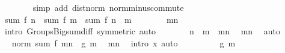\begin{isabellebody}
\ \ \ \ \ \ \isamarkupfalse%
\ {\isacharparenleft}{\kern0pt}simp\ add{\isacharcolon}{\kern0pt}\ dist{\isacharunderscore}{\kern0pt}norm\ norm{\isacharunderscore}{\kern0pt}minus{\isacharunderscore}{\kern0pt}commute{\isacharparenright}{\kern0pt}\isanewline
\ \ \ \ \isamarkupfalse%
\ \isamarkupfalse%
\ {\isachardoublequoteopen}sum\ f\ {\isacharbraceleft}{\kern0pt}{\isachardot}{\kern0pt}{\isachardot}{\kern0pt}n{\isacharbraceright}{\kern0pt}\ {\isacharminus}{\kern0pt}\ sum\ f\ {\isacharbraceleft}{\kern0pt}{\isachardot}{\kern0pt}{\isachardot}{\kern0pt}m{\isacharbraceright}{\kern0pt}\ {\isacharequal}{\kern0pt}\ sum\ f\ {\isacharparenleft}{\kern0pt}{\isacharbraceleft}{\kern0pt}{\isachardot}{\kern0pt}{\isachardot}{\kern0pt}n{\isacharbraceright}{\kern0pt}\ {\isacharminus}{\kern0pt}\ {\isacharbraceleft}{\kern0pt}{\isachardot}{\kern0pt}{\isachardot}{\kern0pt}m{\isacharbraceright}{\kern0pt}{\isacharparenright}{\kern0pt}{\isachardoublequoteclose}\isanewline
\ \ \ \ \ \ \isamarkupfalse%
\ mn\ \isamarkupfalse%
\ {\isacharparenleft}{\kern0pt}intro\ Groups{\isacharunderscore}{\kern0pt}Big{\isachardot}{\kern0pt}sum{\isacharunderscore}{\kern0pt}diff\ {\isacharbrackleft}{\kern0pt}symmetric{\isacharbrackright}{\kern0pt}{\isacharparenright}{\kern0pt}\ auto\isanewline
\ \ \ \ \isamarkupfalse%
\ \isamarkupfalse%
\ {\isachardoublequoteopen}{\isacharbraceleft}{\kern0pt}{\isachardot}{\kern0pt}{\isachardot}{\kern0pt}n{\isacharbraceright}{\kern0pt}\ {\isacharminus}{\kern0pt}\ {\isacharbraceleft}{\kern0pt}{\isachardot}{\kern0pt}{\isachardot}{\kern0pt}m{\isacharbraceright}{\kern0pt}\ {\isacharequal}{\kern0pt}\ {\isacharbraceleft}{\kern0pt}m{\isacharless}{\kern0pt}{\isachardot}{\kern0pt}{\isachardot}{\kern0pt}n{\isacharbraceright}{\kern0pt}{\isachardoublequoteclose}\ \isamarkupfalse%
\ mn\ \isamarkupfalse%
\ auto\isanewline
\ \ \ \ \isamarkupfalse%
\ \isamarkupfalse%
\ {\isachardoublequoteopen}norm\ {\isacharparenleft}{\kern0pt}sum\ f\ {\isacharbraceleft}{\kern0pt}m{\isacharless}{\kern0pt}{\isachardot}{\kern0pt}{\isachardot}{\kern0pt}n{\isacharbraceright}{\kern0pt}{\isacharparenright}{\kern0pt}\ {\isasymle}\ g\ m{\isachardoublequoteclose}\ \isamarkupfalse%
\ mn\ \isamarkupfalse%
\ {\isacharparenleft}{\kern0pt}intro\ x{}{\isacharparenright}{\kern0pt}\ auto\isanewline
\ \ \ \ \isamarkupfalse%
\ \isamarkupfalse%
\ {\isachardoublequoteopen}{\isasymdots}\ {\isasymle}\ {\isasymbar}g\ m{\isasymbar}{\isachardoublequoteclose}\ \isamarkupfalse%

\end{isabellebody}
